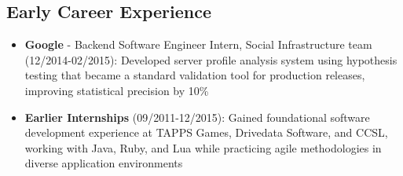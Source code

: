 
\subsection{Early Career Experience}
\begin{itemize}
    \item \small{\textbf{Google} - Backend Software Engineer Intern, Social Infrastructure team} \footnotesize{(12/2014-02/2015): Developed server profile analysis system using hypothesis testing that became a standard validation tool for production releases, improving statistical precision by 10\%}
    
    \item \small{\textbf{Earlier Internships}} \footnotesize{(09/2011-12/2015): Gained foundational software development experience at TAPPS Games, Drivedata Software, and CCSL, working with Java, Ruby, and Lua while practicing agile methodologies in diverse application environments}
\end{itemize}